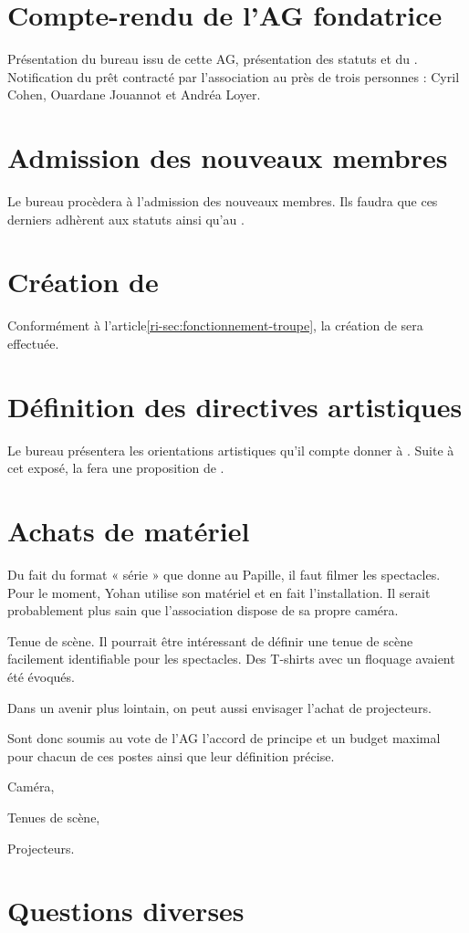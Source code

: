 \section{Compte-rendu de l'AG fondatrice}
Présentation du bureau issu de cette AG, présentation des statuts et du \RI{}.
Notification du prêt contracté par l'association au près de trois personnes : Cyril Cohen, Ouardane Jouannot et Andréa Loyer.
\section{Admission des nouveaux membres}
Le bureau procèdera à l'admission des nouveaux membres. Ils faudra que ces derniers adhèrent aux statuts ainsi qu'au \RI{}.
\section{Création de \troupe{}}
Conformément à l'article\ref{ri-sec:fonctionnement-troupe}, la création de \troupe{} sera effectuée.
\section{Définition des directives artistiques}
Le bureau présentera les orientations artistiques qu'il compte donner à \troupe{}. Suite à cet exposé, la \troupe{} fera une proposition de \DA{}.
\section{Achats de matériel}

Du fait du format « série » que \meta{} donne au Papille, il faut filmer les spectacles. Pour le moment, Yohan utilise son matériel et en fait l'installation. Il serait probablement plus sain que l'association dispose de sa propre caméra.

Tenue de scène. Il pourrait être intéressant de définir une tenue de scène facilement identifiable pour les spectacles. Des T-shirts avec un floquage avaient été évoqués.

Dans un avenir plus lointain, on peut aussi envisager l'achat de projecteurs.

Sont donc soumis au vote de l'AG l'accord de principe et un budget maximal pour chacun de ces postes ainsi que leur définition précise.

\begin{myitemize}
	\item Caméra,
	\item Tenues de scène,
	\item Projecteurs.
\end{myitemize}

\section{Questions diverses}

